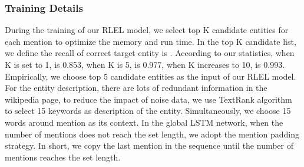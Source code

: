 \documentclass[sigconf]{acmart}
\begin{document}
\begin{table}
\caption{Statistics of document and mention numbers on experimental datasets.}
\renewcommand\arraystretch{1.1}
\newcommand{\tabincell}[2]{\begin{tabular}{@{}#1@{}}#2\end{tabular}}
\centering
{}
\setlength{\abovecaptionskip}{8pt}
\end{table}

\subsubsection*{Training Details}
During the training of our RLEL model, we select top K candidate entities for each mention to optimize the memory and run time. In the top K candidate list, we define the recall of correct target entity is . According to our statistics, when K is set to 1,  is 0.853, when K is 5,  is 0.977, when K increases to 10,  is 0.993. Empirically, we choose top 5 candidate entities as the input of our RLEL model. For the entity description, there are lots of redundant information in the wikipedia page, to reduce the impact of noise data, we use TextRank algorithm \cite{MihalceaT04} to select 15 keywords as description of the entity. Simultaneously, we choose 15 words around mention as its context. In the global LSTM network, when the number of mentions does not reach the set length, we adopt the mention padding strategy. In short, we copy the last mention in the sequence until the number of mentions reaches the set length.
\end{document}
